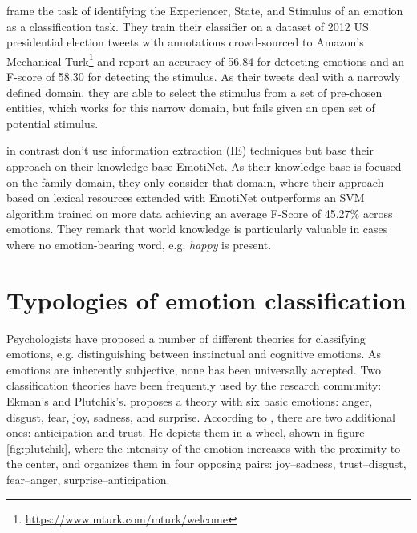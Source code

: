 \citeauthor{semantic_role_labeling_tweets} frame the task of identifying the Experiencer, State, and Stimulus of an emotion as a classification task. They train their classifier on a dataset of 2012 US presidential election tweets with annotations crowd-sourced to Amazon's Mechanical Turk\footnote{\url{https://www.mturk.com/mturk/welcome}} and report an accuracy of 56.84 for detecting emotions and an F-score of 58.30 for detecting the stimulus. As their tweets deal with a narrowly defined domain, they are able to select the stimulus from a set of pre-chosen entities, which works for this narrow domain, but fails given an open set of potential stimulus.

\citeauthor{implicit_emotions} in contrast don't use information extraction (IE) techniques but base their approach on their knowledge base EmotiNet. As their knowledge base is focused on the family domain, they only consider that domain, where their approach based on lexical resources extended with EmotiNet outperforms an SVM algorithm trained on more data achieving an average F-Score of 45.27\% across emotions. They remark that world knowledge is particularly valuable in cases where no emotion-bearing word, e.g. \textit{happy} is present.

\section{Typologies of emotion classification}

Psychologists have proposed a number of different theories for classifying emotions, e.g. distinguishing between instinctual and cognitive emotions. As emotions are inherently subjective, none has been universally accepted. Two classification theories have been frequently used by the research community: Ekman's and Plutchik's. \citeauthor{ekman_basic_emotions} proposes a theory with six basic emotions: anger, disgust, fear, joy, sadness, and surprise. According to \citeauthor{plutchik}, there are two additional ones: anticipation and trust. He depicts them in a wheel, shown in figure \ref{fig:plutchik}, where the intensity of the emotion increases with the proximity to the center, and organizes them in four opposing pairs: joy--sadness, trust--disgust, fear--anger, surprise--anticipation.

